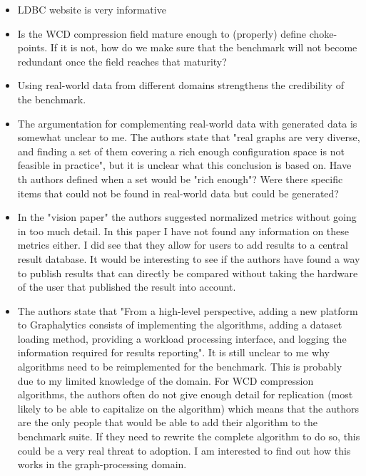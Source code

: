 \begin{itemize}
\item LDBC website is very informative
\item Is the WCD compression field mature enough to (properly) define choke-points. If it is not, how do we make sure that the benchmark will not become redundant once the field reaches that maturity?
\item Using real-world data from different domains strengthens the credibility of the benchmark.
\item The argumentation for complementing real-world data with generated data is somewhat unclear to me. The authors state that "real graphs are very diverse, and finding a set of them covering a rich enough configuration space is not feasible in practice", but it is unclear what this conclusion is based on. Have th authors defined when a set would be "rich enough"? Were there specific items that could not be found in real-world data but could be generated?
\item In the "vision paper" \cite{guo2014benchmarking} the authors suggested normalized metrics without going in too much detail. In this paper I have not found any information on these metrics either. I did see that they allow for users to add results to a central result database. It would be interesting to see if the authors have found a way to publish results that can directly be compared without taking the hardware of the user that published the result into account.
\item The authors state that "From a high-level perspective, adding a new platform to Graphalytics consists of implementing the algorithms, adding a dataset loading method, providing a workload processing interface, and logging the information required for results reporting". It is still unclear to me why algorithms need to be reimplemented for the benchmark. This is probably due to my limited knowledge of the domain. For WCD compression algorithms, the authors often do not give enough detail for replication (most likely to be able to capitalize on the algorithm) which means that the authors are the only people that would be able to add their algorithm to the benchmark suite. If they need to rewrite the complete algorithm to do so, this could be a very real threat to adoption. I am interested to find out how this works in the graph-processing domain.
\end{itemize}
